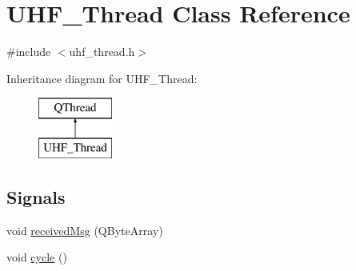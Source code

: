 \hypertarget{class_u_h_f___thread}{}\section{U\+H\+F\+\_\+\+Thread Class Reference}
\label{class_u_h_f___thread}


{\ttfamily \#include $<$uhf\+\_\+thread.\+h$>$}

Inheritance diagram for U\+H\+F\+\_\+\+Thread\+:\begin{figure}[H]
\begin{center}
\leavevmode
\includegraphics[height=2.000000cm]{class_u_h_f___thread}
\end{center}
\end{figure}
\subsection*{Signals}
\begin{DoxyCompactItemize}
\item 
void \mbox{\hyperlink{class_u_h_f___thread_aa3b7dd0bbada4349d59821aab8a17927}{received\+Msg}} (Q\+Byte\+Array)
\item 
void \mbox{\hyperlink{class_u_h_f___thread_a232f1c855e0b835beebcdb4a6b6a4484}{cycle}} ()
\end{DoxyCompactItemize}
